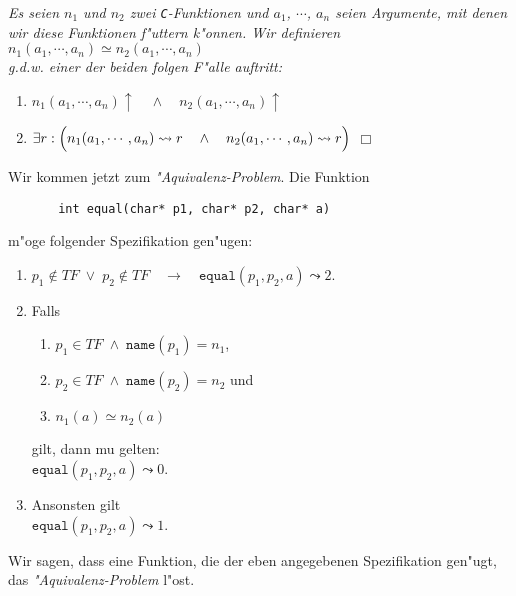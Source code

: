 \begin{Definition}[$\simeq$] 
{\em 
Es seien $n_1$ und $n_2$ zwei \texttt{C}-Funktionen und
  $a_1$, $\cdots$, $a_n$ seien Argumente, mit denen wir diese Funktionen f"uttern k"onnen. Wir definieren \\[0.3cm]
\hspace*{1.3cm} $n_1(a_1,\cdots,a_n) \simeq n_2(a_1,\cdots,a_n)$ \\[0.3cm]
g.d.w. einer der beiden folgen F"alle auftritt:
\begin{enumerate}
\item $n_1(a_1,\cdots,a_n)\uparrow \quad\wedge\quad n_2(a_1,\cdots,a_n)\uparrow$
\item $\exists r: \Bigl(n_1(a_1,\cdots,a_n) \leadsto r \quad\wedge\quad n_2(a_1,\cdots,a_n) \leadsto r\Bigr)$
  \hspace*{\fill} $\Box$
\end{enumerate}}
\end{Definition}

\noindent
Wir kommen jetzt zum \emph{"Aquivalenz-Problem}.  Die Funktion
\begin{verbatim}
       int equal(char* p1, char* p2, char* a)
\end{verbatim}
m"oge folgender Spezifikation gen"ugen:
\begin{enumerate}
\item $p_1 \not\in T\!F \;\vee\; p_2 \not\in T\!F \quad\rightarrow\quad \mathtt{equal}(p_1, p_2, a) \leadsto 2$.
\item Falls 
  \begin{enumerate}
  \item $p_1 \in T\!F \;\wedge\; \mathtt{name}(p_1) = n_1$,
  \item $p_2 \in T\!F \;\wedge\; \mathtt{name}(p_2) = n_2$ \quad und
  \item $n_1(a) \simeq n_2(a)$
  \end{enumerate}
    gilt, dann mu\3 gelten: \\[0.3cm]
   \hspace*{1.3cm}  $\mathtt{equal}(p_1, p_2, a) \leadsto 0$.
\item Ansonsten gilt \\[0.1cm]
      \hspace*{1.3cm} $\mathtt{equal}(p_1, p_2, a) \leadsto 1$.
\end{enumerate}
Wir sagen, dass eine Funktion, die der eben angegebenen Spezifikation gen"ugt, das
\emph{"Aquivalenz-Problem} l"ost.

